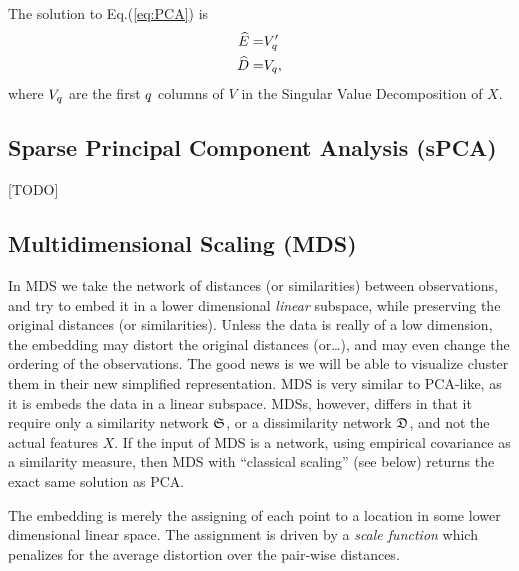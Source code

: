 The solution to Eq.(\ref{eq:PCA}) is 
\begin{align}
\label{eq:PCA_solution}
	\widehat{E} =& V_q' \\
	\widehat{D} =& V_q,
\end{align}
where $V_q$ are the first $q$ columns of $V$ in the Singular Value Decomposition of $X$.






\subsection{Sparse Principal Component Analysis (sPCA)}
\label{sec:spca}
[TODO]






\subsection{Multidimensional Scaling (MDS)}
\label{sec:mds}

In MDS we take the network of distances (or similarities) between observations, and try to embed it in a lower dimensional \emph{linear} subspace, while preserving the original distances (or similarities).
Unless the data is really of a low dimension, the embedding may distort the original distances (or\dots), and may even change the ordering of the observations. The good news is we will be able to visualize \andor cluster them in their new simplified representation. 
MDS is very similar to PCA-like, as it is embeds the data in a linear subspace.  MDSs, however, differs in that it require only a similarity network $\mathfrak{S}$, or a dissimilarity network $\mathfrak{D}$, and not the actual features $X$. 
If the input of MDS is a network, using empirical covariance as a similarity measure, then MDS with ``classical scaling'' (see below) returns the exact same solution as PCA.

The embedding is merely the assigning of each point to a location in some lower dimensional linear space. 
The assignment is driven by a \emph{scale function} which penalizes for the average distortion over the pair-wise distances.


